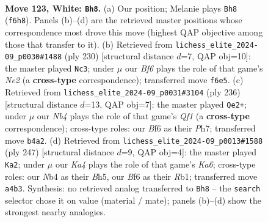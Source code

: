 \documentclass[11pt]{article}
\begin{document}
\clearpage

\begin{figure}[p]\centering
\begin{subfigure}{0.46\textwidth}\centering
\resizebox{\linewidth}{!}{%
\newchessgame
\chessboard[
  setfen={8/3k4/5B2/5q2/KN6/8/8/8 w - - 14 123},
  showmover=false,
  pgfstyle=straightmove, color=movearrow, markmove={f6-h8}
]}
\caption{}
\end{subfigure}\hfill
\begin{subfigure}{0.46\textwidth}\centering
\resizebox{\linewidth}{!}{%
\newchessgame
\chessboard[
  setfen={8/8/8/2k1q3/8/3K4/4N3/8 w - - 8 116},
  showmover=false,
  pgfstyle=straightmove, color=movearrow, markmove={e2-c3}
]}
\caption{}
\end{subfigure}
\\[4pt]
\begin{subfigure}{0.46\textwidth}\centering
\resizebox{\linewidth}{!}{%
\newchessgame
\chessboard[
  setfen={7q/K6P/8/8/8/8/1k6/5Q2 w - - 99 119},
  showmover=false,
  pgfstyle=straightmove, color=movearrow, markmove={f1-e2}
]}
\caption{}
\end{subfigure}\hfill
\begin{subfigure}{0.46\textwidth}\centering
\resizebox{\linewidth}{!}{%
\newchessgame
\chessboard[
  setfen={8/8/8/2K4b/8/k3Q3/8/1r6 b - - 85 124},
  showmover=false,
  pgfstyle=straightmove, color=movearrow, markmove={a3-a2}
]}
\caption{}
\end{subfigure}
\caption{\textbf{Move 123, White: \texttt{Bh8}.} (a) Our position; Melanie plays \texttt{Bh8} (\texttt{f6h8}). Panels (b)--(d) are the retrieved master positions whose correspondence most drove this move (highest QAP objective among those that transfer to it). (b) Retrieved from \texttt{lichess\_elite\_2024-09\_p0030\#1488} (ply 230) [structural distance $d$=7, QAP obj=10]: the master played \texttt{Nc3}; under $\mu$ our \emph{Bf6} plays the role of that game's \emph{Ne2} (a \textbf{cross-type} correspondence); transferred move \texttt{f6e5}. (c) Retrieved from \texttt{lichess\_elite\_2024-09\_p0031\#3104} (ply 236) [structural distance $d$=13, QAP obj=7]: the master played \texttt{Qe2+}; under $\mu$ our \emph{Nb4} plays the role of that game's \emph{Qf1} (a \textbf{cross-type} correspondence); cross-type roles: our \emph{B}f6 as their \emph{P}h7; transferred move \texttt{b4a2}. (d) Retrieved from \texttt{lichess\_elite\_2024-09\_p0013\#1588} (ply 247) [structural distance $d$=9, QAP obj=4]: the master played \texttt{Ka2}; under $\mu$ our \emph{Ka4} plays the role of that game's \emph{Ka6}; cross-type roles: our \emph{N}b4 as their \emph{B}h5, our \emph{B}f6 as their \emph{R}b1; transferred move \texttt{a4b3}. Synthesis: no retrieved analog transferred to \texttt{Bh8} -- the \texttt{search} selector chose it on value (material / mate); panels (b)--(d) show the strongest nearby analogies.}
\label{fig:thought-m244}
\end{figure}
\end{document}
